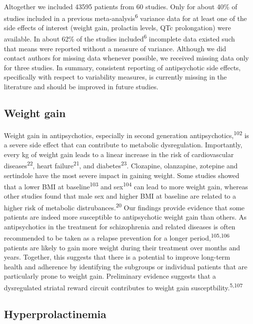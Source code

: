 \documentclass[9pt,english,,jou,floatsintext]{apa6}
\begin{document}
Altogether we included 43595 patients from 60 studies. Only for about
40\% of studies included in a previous meta-analysis\textsuperscript{6}
variance data for at least one of the side effects of interest (weight
gain, prolactin levels, QTc prolongation) were available. In about 62\%
of the studies included\textsuperscript{6} incomplete data existed such
that means were reported without a measure of variance. Although we did
contact authors for missing data whenever possible, we received missing
data only for three studies. In summary, consistent reporting of
antipsychotic side effects, specifically with respect to variability
measures, is currently missing in the literature and should be improved
in future studies.

\subsection{Weight gain}\label{weight-gain-1}

Weight gain in antipsychotics, especially in second generation
antipsychotics,\textsuperscript{102} is a severe side effect that can
contribute to metabolic dysregulation. Importantly, every kg of weight
gain leads to a linear increase in the risk of cardiovascular
diseases\textsuperscript{22}, heart failure\textsuperscript{21}, and
diabetes\textsuperscript{23}. Clozapine, olanzapine, zotepine and
sertindole have the most severe impact in gaining weight. Some studies
showed that a lower BMI at baseline\textsuperscript{103} and
sex\textsuperscript{104} can lead to more weight gain, whereas other
studies found that male sex and higher BMI at baseline are related to a
higher risk of metabolic distrubances.\textsuperscript{20} Our findings
provide evidence that some patients are indeed more susceptible to
antipsychotic weight gain than others. As antipsychotics in the
treatment for schizophrenia and related diseases is often recommended to
be taken as a relapse prevention for a longer
period,\textsuperscript{105,106} patients are likely to gain more weight
during their treatment over months and years. Together, this suggests
that there is a potential to improve long-term health and adherence by
identifying the subgroups or individual patients that are particularly
prone to weight gain. Preliminary evidence suggests that a dysregulated
striatal reward circuit contributes to weight gain
susceptbility.\textsuperscript{5,107}

\subsection{Hyperprolactinemia}\label{hyperprolactinemia-1}
\end{document}
